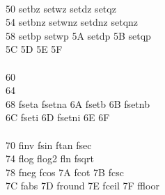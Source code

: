 \documentclass[letterpaper,10pt,openright,twoside,onecolumn]{book}
\begin{document}
\begin{tabbing}
    \\
    50 \> setbz	 \> setwz	 \> setdz	 \> setqz	\\
    54 \> setbnz \> setwnz	 \> setdnz	 \> setqnz	\\
    58 \> setbp	 \> setwp	\> 5A \> setdp	\> 5B \> setqp	\\
    5C \> 	\> 5D \> 	\> 5E \> 	\> 5F \> 	\\
    \\
    60 \> 	 \> 	 \> 	 \> 	\\
    64 \> 	 \> 	 \> 	 \> 	\\
    68 \> fseta	 \> fsetna	\> 6A \> fsetb	\> 6B \> fsetnb	\\
    6C \> fseti	\> 6D \> fsetni	\> 6E \> 	\> 6F \> 	\\
    \\
    70 \> finv	 \> fsin	 \> ftan	 \> fsec	\\
    74 \> flog	 \> flog2	 \> fln	 \> fsqrt	\\
    78 \> fneg	 \> fcos	\> 7A \> fcot	\> 7B \> fcsc	\\
    7C \> fabs	\> 7D \> fround	\> 7E \> fceil	\> 7F \> ffloor	\\
  \end{tabbing}
\end{document}
